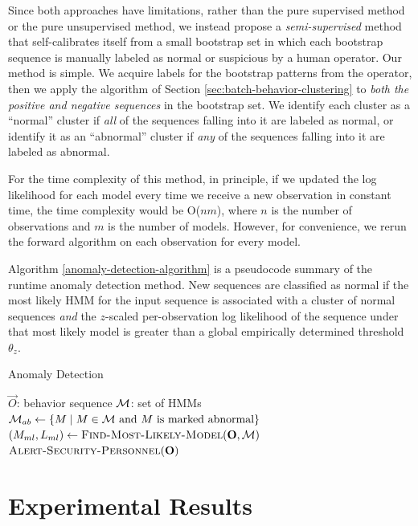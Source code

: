 Since both approaches have limitations, rather than the pure
supervised method or the pure unsupervised method, we instead propose
a \textit{semi-supervised} method that self-calibrates itself from a
small bootstrap set in which each bootstrap sequence is manually
labeled as normal or suspicious by a human operator.  Our method is
simple.  We acquire labels for the bootstrap patterns from the
operator, then we apply the algorithm of
Section \ref{sec:batch-behavior-clustering} to
\textit{both the positive and negative sequences} in the bootstrap
set.  We identify each cluster as a ``normal'' cluster if \textit{all}
of the sequences falling into it are labeled as normal, or identify it
as an ``abnormal'' cluster if \textit{any} of the sequences falling
into it are labeled as abnormal.

For the time complexity of this method, in principle, if we updated
the log likelihood for each model every time we receive a new
observation in constant time, the time complexity would be O($nm$),
where $n$ is the number of observations and $m$ is the number of
models. However, for convenience, we rerun the forward
algorithm  on each observation for every
model.

Algorithm \ref{anomaly-detection-algorithm} is a pseudocode summary of
the runtime anomaly detection method. New sequences are classified as
normal if the most likely HMM for the input sequence is associated
with a cluster of normal sequences \textit{and} the $z$-scaled
per-observation log likelihood of the sequence under that most likely
model is greater than a global empirically determined threshold
$\theta_z$.

\begin{algorithm}[t]
  \caption{Anomaly Detection}
  \label{anomaly-detection-algorithm}
  \begin{algorithmic}
    \REQUIRE $\vec{O}$: behavior sequence
    \REQUIRE ${\cal M}$: set of HMMs
    \STATE ${\cal M}_{ab} \gets \{ M \mid M \in {\cal M} \text{~and $M$ is marked abnormal} \}$
    \STATE $( M_{ml}, L_{ml} ) \gets \textsc{Find-Most-Likely-Model}(\vec{O}, {\cal M})$
      \STATE $\textsc{Alert-Security-Personnel}(\vec{O})$
    \ENDIF
  \end{algorithmic}
\end{algorithm}

\section{Experimental Results}
\label{sec:batch-results}

